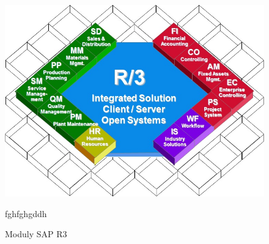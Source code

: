 \documentclass[thesis=M,czech]{FITthesis}[2012/06/26]
\begin{document}
\begin{figure}[H]
	\centering
	\includegraphics[width=1\textwidth]{images/sap_r3.jpg}
	\caption{Moduly SAP R3}
	\label{img:sapr3}
	\small
	fghfghgddh
\end{figure}
\end{document}
